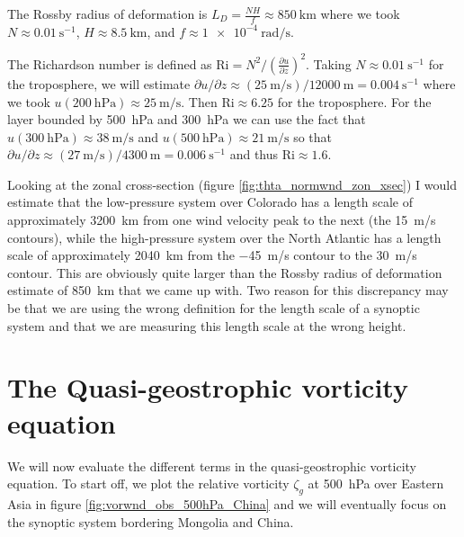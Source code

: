 \documentclass[11pt]{article}
\newcommand\p[2]{\frac{\partial #1}{\partial #2}}
\begin{document}
The Rossby radius of deformation is $\displaystyle L_D = \frac{NH}{f} \approx \SI{850}{\km}$ where we took $N \approx \SI{0.01}{\s^{-1}}$, $H \approx \SI{8.5}{\km}$, and $f \approx \SI{1e-4}{\radian/\s}$.

The Richardson number is defined as $\displaystyle \mathrm{Ri} = N^2 / \left( \p{u}{z} \right)^2$. Taking $N \approx \SI{0.01}{\s^{-1}}$ for the troposphere, we will estimate $\partial u/\partial z \approx (\SI{25}{\m/\s}) / \SI{12000}{\m} = \SI{0.004}{\s^{-1}}$ where we took $u(\SI{200}{\hecto\Pa}) \approx \SI{25}{\m/\s}$. Then $\mathrm{Ri} \approx 6.25$ for the troposphere. For the layer bounded by \SI{500}{\hecto\Pa} and \SI{300}{\hecto\Pa} we can use the fact that $u(\SI{300}{\hecto\Pa}) \approx \SI{38}{\m/\s}$ and $u(\SI{500}{\hecto\Pa}) \approx \SI{21}{\m/\s}$ so that $\partial u/\partial z \approx (\SI{27}{\m/\s}) / \SI{4300}{\m} = \SI{0.006}{\s^{-1}}$ and thus $\mathrm{Ri} \approx 1.6$.

Looking at the zonal cross-section (figure \ref{fig:thta_normwnd_zon_xsec}) I would estimate that the low-pressure system over Colorado has a length scale of approximately \SI{3200}{\km} from one wind velocity peak to the next (the \SI{15}{\m/\s} contours), while the high-pressure system over the North Atlantic has a length scale of approximately \SI{2040}{\km} from the \SI{-45}{\m/\s} contour to the \SI{30}{\m/\s} contour. This are obviously quite larger than the Rossby radius of deformation estimate of \SI{850}{\km} that we came up with. Two reason for this discrepancy may be that we are using the wrong definition for the length scale of a synoptic system and that we are measuring this length scale at the wrong height.

\section{The Quasi-geostrophic vorticity equation}
We will now evaluate the different terms in the quasi-geostrophic vorticity equation. To start off, we plot the relative vorticity $\zeta_g$ at \SI{500}{\hecto\Pa} over Eastern Asia in figure \ref{fig:vorwnd_obs_500hPa_China} and we will eventually focus on the synoptic system bordering Mongolia and China.
\end{document}
